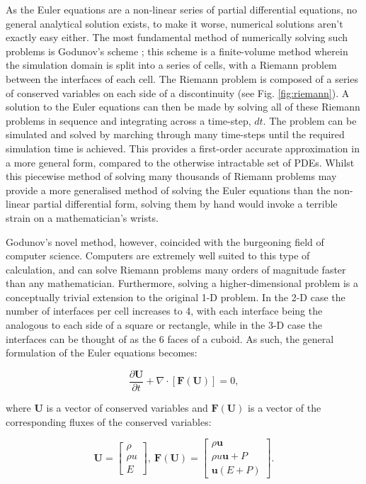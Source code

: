 \noindent
As the Euler equations are a non-linear series of partial differential equations, no general analytical solution exists, to make it worse, numerical solutions aren't exactly easy either.
The most fundamental method of numerically solving such problems is Godunov's scheme \parencite{godunov_difference_1959}; this scheme is a finite-volume method wherein the simulation domain is split into a series of cells, with a Riemann problem between the interfaces of each cell.
The Riemann problem is composed of a series of conserved variables on each side of a discontinuity (see Fig. \ref{fig:riemann}).
A solution to the Euler equations can then be made by solving all of these Riemann problems in sequence and integrating across a time-step, $dt$.
The problem can be simulated and solved by marching through many time-steps until the required simulation time is achieved.
This provides a first-order accurate approximation in a more general form, compared to the otherwise intractable set of PDEs. 
Whilst this piecewise method of solving many thousands of Riemann problems may provide a more generalised method of solving the Euler equations than the non-linear partial differential form, solving them by hand would invoke a terrible strain on a mathematician's wrists.

Godunov's novel method, however, coincided with the burgeoning field of computer science.
Computers are extremely well suited to this type of calculation, and can solve Riemann problems many orders of magnitude faster than any mathematician.
Furthermore, solving a higher-dimensional problem is a conceptually trivial extension to the original 1-D problem.
In the 2-D case the number of interfaces per cell increases to 4, with each interface being the analogous to each side of a square or rectangle, while in the 3-D case the interfaces can be thought of as the 6 faces of a cuboid.
As such, the general formulation of the Euler equations becomes:

\begin{equation}
  \frac{\partial \mathbf{U}}{\partial t} + \nabla \cdot \left[ \mathbf{F}(\mathbf{U}) \right] = 0 ,
\end{equation}

\noindent
where $\mathbf{U}$ is a vector of conserved variables and $\mathbf{F}(\mathbf{U})$ is a vector of the corresponding fluxes of the conserved variables:

\begin{equation}
  \mathbf{U} = 
  \begin{bmatrix}
    \rho \\
    \rho u \\
    E
  \end{bmatrix}
  , ~
  \mathbf{F}(\mathbf{U}) =
  \begin{bmatrix}
    \rho \boldsymbol{u} \\
    \rho u \boldsymbol{u} + P \\
    \boldsymbol{u}(E + P)
  \end{bmatrix} .
\end{equation}

